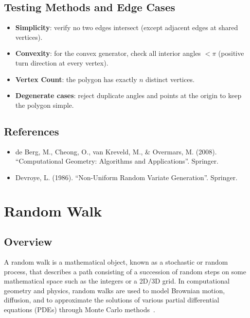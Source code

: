 \subsection{Testing Methods and Edge Cases}
\begin{itemize}
    \item \textbf{Simplicity}: verify no two edges intersect (except adjacent
      edges at shared vertices).
    \item \textbf{Convexity}: for the convex generator, check all interior
      angles $< \pi$ (positive turn direction at every vertex).
    \item \textbf{Vertex Count}: the polygon has exactly $n$ distinct
      vertices.
    \item \textbf{Degenerate cases}: reject duplicate angles and points at the
      origin to keep the polygon simple.
\end{itemize}

\subsection{References}
\begin{itemize}
    \item de Berg, M., Cheong, O., van Kreveld, M., \& Overmars, M. (2008).
      ``Computational Geometry: Algorithms and Applications''. Springer.
    \item Devroye, L. (1986). ``Non-Uniform Random Variate Generation''.
      Springer.
\end{itemize}

\section{Random Walk}
\label{sec:random_walk}

\subsection{Overview}
A random walk is a mathematical object, known as a stochastic or random process, that describes a path consisting of a succession of random steps on some mathematical space such as the integers or a 2D/3D grid. In computational geometry and physics, random walks are used to model Brownian motion, diffusion, and to approximate the solutions of various partial differential equations (PDEs) through Monte Carlo methods~\cite{pearson1905}.

